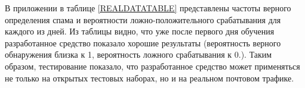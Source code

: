 В приложении в таблице \ref{REALDATATABLE} представлены частоты верного определения спама и вероятности ложно-положительного срабатывания для каждого из дней. Из таблицы видно, что уже после первого дня обучения  разработанное средство показало хорошие результаты (вероятность верного обнаружения близка к 1, вероятность ложного срабатывания к 0.). Таким образом, тестирование показало, что разработанное средство может применяться не только на открытых тестовых наборах, но и на реальном почтовом трафике.


